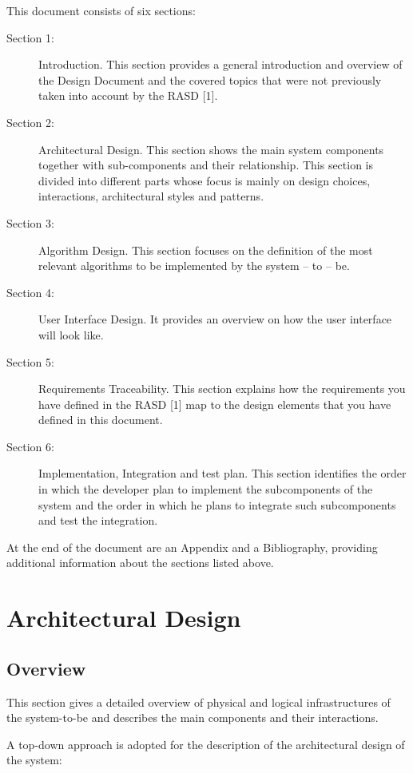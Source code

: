 \documentclass{article}
\begin{document}
	This document consists of six sections:

	\begin{description}
	\item [Section 1:] Introduction. This section provides a general introduction and overview of the Design Document and the covered topics that were not previously taken into account by the RASD [1].
	\item [Section 2:] Architectural Design. This section shows the main system components together with sub-components and their relationship. This section is divided into different parts whose focus is mainly on design choices, interactions, architectural styles and patterns.
	\item [Section 3:] Algorithm Design. This section focuses on the definition of the most relevant algorithms to be implemented by the system – to – be.
	\item [Section 4:] User Interface Design. It provides an overview on how the user interface will look like.
	\item [Section 5:] Requirements Traceability. This section explains how the requirements you have defined in the RASD [1] map to the design elements that you have defined in this document.
	\item [Section 6:] Implementation, Integration and test plan. This section identifies the order in which the developer plan to implement the subcomponents of the system and the order in which he plans to integrate such subcomponents and test the integration.
	\end{description}

	\bigskip
	At the end of the document are an Appendix and a Bibliography, providing additional information about the sections listed above.

	\section{Architectural Design}
	
	\subsection{Overview}

	This section gives a detailed overview of physical and logical infrastructures of the system-to-be and describes the main components and their interactions.

	A top-down approach is adopted for the description of the architectural design of the system:
\end{document}
